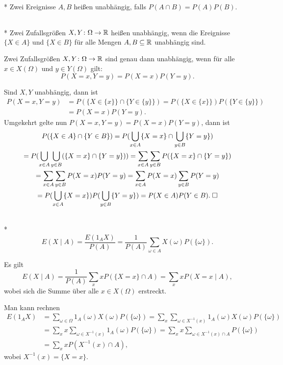\begin{Definition}%
\mbox{}\\*
Zwei Ereignisse $A,B$ heißen unabhängig, falls $P(A\cap B)=P(A)P(B)$.
\end{Definition}

\begin{Definition}%
\mbox{}\\*
Zwei Zufallsgrößen $X,Y\colon\Omega\to\mathbb R$ heißen unabhängig, wenn
die Ereignisse $\{X\in A\}$ und $\{X\in B\}$
für alle Mengen $A,B\subseteq\mathbb R$ unabhängig sind.
\end{Definition}

\begin{Satz}
Zwei Zufallsgrößen $X,Y\colon\Omega\to\mathbb R$ sind genau dann unabhängig,
wenn für alle $x\in X(\Omega)$ und $y\in Y(\Omega)$ gilt:
\[P(X=x,Y=y)= P(X=x)P(Y=y).\]
\end{Satz}
 Sind $X,Y$ unabhängig, dann ist
\begin{align*}
P(X=x,Y=y) &= P(\{X\in\{x\}\}\cap\{Y\in\{y\}\})
= P(\{X\in\{x\}\})P(\{Y\in\{y\}\})\\
&= P(X=x)P(Y=y).
\end{align*}
Umgekehrt gelte nun $P(X=x,Y=y)=P(X=x)P(Y=y)$, dann ist
\begin{gather*}
P(\{X\in A\}\cap\{Y\in B\})
= P(\bigcup_{x\in A}\{X=x\}\cap\bigcup_{y\in B}\{Y=y\})\\
= P(\bigcup_{x\in A}\bigcup_{y\in B}(\{X=x\}\cap\{Y=y\}))
= \sum_{x\in A}\sum_{y\in B}P(\{X=x\}\cap\{Y=y\})\\
= \sum_{x\in A}\sum_{y\in B}P(X=x)P(Y=y)
= \sum_{x\in A}P(X=x)\sum_{y\in B}P(Y=y)\\
= P(\bigcup_{x\in A}\{X=x\})P(\bigcup_{y\in B}\{Y=y\})
= P(X\in A)P(Y\in B).\;\square
\end{gather*}

\begin{Definition}%
%
\label{def:cond-expected-value}\mbox{}\\*
\[E(X\mid A) = \frac{E(1_A X)}{P(A)} = \frac{1}{P(A)}\sum_{\omega\in A} X(\omega)P(\{\omega\}).\]
\end{Definition}

\begin{Satz} Es gilt
\[E(X\mid A) = \frac{1}{P(A)}\sum_x xP(\{X=x\}\cap A)
= \sum_x xP(X=x\mid A),\]
wobei sich die Summe über alle $x\in X(\Omega)$ erstreckt.
\end{Satz}
 Man kann rechnen
\begin{align*}
E(1_A X) &= \sum_{\omega\in\Omega} 1_A(\omega) X(\omega) P(\{\omega\})
= \sum_x\sum_{\omega\in X^{-1}(x)} 1_A(\omega) X(\omega) P(\{\omega\})\\
&= \sum_x x\sum_{\omega\in X^{-1}(x)} 1_A(\omega) P(\{\omega\})
= \sum_x x\sum_{\omega\in X^{-1}(x)\cap A} P(\{\omega\})\\
&= \sum_x x P(X^{-1}(x)\cap A),
\end{align*}
wobei $X^{-1}(x) = \{X=x\}$.\;\qedsymbol

